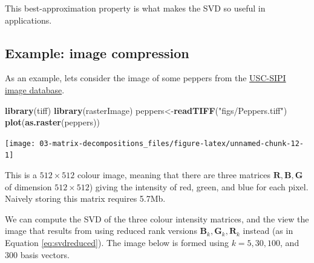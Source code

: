 \documentclass[]{book}
\newenvironment{Shaded}{\begin{snugshade}}{\end{snugshade}}
\newcommand{\KeywordTok}[1]{\textcolor[rgb]{0.13,0.29,0.53}{\textbf{#1}}}
\newcommand{\NormalTok}[1]{#1}
\newcommand{\StringTok}[1]{\textcolor[rgb]{0.31,0.60,0.02}{#1}}
\theoremstyle{definition}
\theoremstyle{definition}
\theoremstyle{definition}
\theoremstyle{remark}
\begin{document}
This best-approximation property is what makes the SVD so useful in applications.

\hypertarget{example-image-compression}{%
\subsection{Example: image compression}\label{example-image-compression}}

As an example, lets consider the image of some peppers from the \href{http://sipi.usc.edu/database/}{USC-SIPI image database}.

\begin{Shaded}
\begin{Highlighting}[]
\KeywordTok{library}\NormalTok{(tiff)}
\KeywordTok{library}\NormalTok{(rasterImage)}
\NormalTok{peppers<-}\KeywordTok{readTIFF}\NormalTok{(}\StringTok{"figs/Peppers.tiff"}\NormalTok{)}
\KeywordTok{plot}\NormalTok{(}\KeywordTok{as.raster}\NormalTok{(peppers))}
\end{Highlighting}
\end{Shaded}

\texttt{[image: 03-matrix-decompositions\_files/figure-latex/unnamed-chunk-12-1]}

This is a \(512 \times 512\) colour image, meaning that there are three matrices \(\mathbf R, \mathbf B,\mathbf G\) of dimension \(512\times 512\)) giving the intensity of red, green, and blue for each pixel.
Naively storing this matrix requires 5.7Mb.

We can compute the SVD of the three colour intensity matrices, and the view the image that results from using reduced rank versions \(\mathbf B_k, \mathbf G_k, \mathbf R_k\) instead (as in Equation \eqref{eq:svdreduced}). The image below is formed using \(k=5, 30, 100\), and \(300\) basis vectors.
\end{document}
